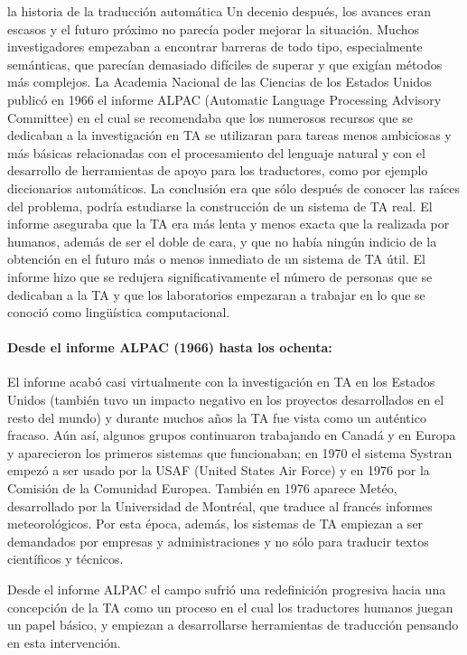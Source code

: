 \begin{persabermes}{la historia de la traducción automática}
Un decenio después, los avances eran escasos y el futuro próximo no parecía poder mejorar la situación. Muchos investigadores empezaban a encontrar barreras de todo tipo, especialmente semánticas, que parecían demasiado difíciles de superar y que exigían métodos más complejos. La Academia Nacional de las Ciencias de los Estados Unidos publicó en 1966 el informe ALPAC (Automatic Language Processing Advisory Committee) en el cual se recomendaba que los numerosos recursos que se dedicaban a la investigación en TA se utilizaran para tareas menos ambiciosas y más básicas relacionadas con el procesamiento del lenguaje natural y con el desarrollo de herramientas de apoyo para los traductores, como por ejemplo diccionarios automáticos. La conclusión era que sólo después de conocer las raíces del problema, podría estudiarse la construcción de un sistema de TA real. El informe aseguraba que la TA era más lenta y menos exacta que la realizada por humanos, además de ser el doble de cara, y que no había ningún indicio de la obtención en el futuro más o menos inmediato de un sistema de TA útil. El informe hizo que se redujera significativamente el número de personas que se dedicaban a la TA y que los laboratorios empezaran a trabajar en lo que se conoció como lingüística computacional. 

\paragraph{Desde el informe ALPAC (1966) hasta los ochenta:} El informe acabó casi virtualmente con la investigación en TA en los Estados Unidos (también tuvo un impacto negativo en los proyectos desarrollados en el resto del mundo) y durante muchos años la TA fue vista como un auténtico fracaso. Aún así, algunos grupos continuaron trabajando en Canadá y en Europa y aparecieron los primeros sistemas que funcionaban; en 1970 el sistema Systran empezó a ser usado por la USAF (United States Air Force) y en 1976 por la Comisión de la Comunidad Europea. También en 1976 aparece Metéo, desarrollado por la Universidad de Montréal, que traduce al francés informes meteorológicos. Por esta época, además, los sistemas de TA empiezan a ser demandados por empresas y administraciones y no sólo para traducir textos científicos y técnicos. 

Desde el informe ALPAC el campo sufrió una redefinición progresiva hacia una concepción de la TA como un proceso en el cual los traductores humanos juegan un papel básico, y empiezan a desarrollarse herramientas de traducción pensando en esta intervención. 


\end{persabermes}
